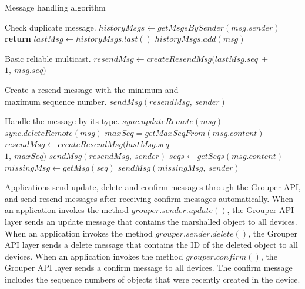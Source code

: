 \documentclass{sig-alternate-05-2015}
\begin{document}
\begin{algorithm}[t]
	\caption{Message handling algorithm}\label{alg:euclid}
	\begin{algorithmic}[1]		
		\LeftComment Check duplicate message.
		\State  $historyMsgs \gets getMsgsBySender(msg.sender)$
		\State \textbf{return}
		\EndIf
		\State $lastMsg \gets historyMsgs.last()$
		\State $historyMsgs.add(msg)$
		
		\LeftComment Basic reliable multicast.
		\State $resendMsg \gets createResendMsg(lastMsg.seq\ +\ $ \\\hspace{2.7cm} $1,\ msg.seq)$
		
		\Comment Create a resend message with the minimum and \\\hspace{1.7cm} maximum sequence number.
		\State $sendMsg(resendMsg,\ sender)$
		\EndIf
		
		\LeftComment Handle the message by its type.
		\State $sync.updateRemote(msg)$
		\State $sync.deleteRemote(msg)$
		\State $maxSeq = getMaxSeqFrom(msg.content)$
		\State $resendMsg \gets createResendMsg(lastMsg.seq\ +\ $ \\\hspace{2.7cm}  $1,\ maxSeq)$
		\State $sendMsg(resendMsg,\ sender)$
		\EndIf
		\State $seqs \gets getSeqs(msg.content)$
		\State $missingMsg \gets getMsg(seq)$
		\State $sendMsg(missingMsg,\ sender)$
		\EndFor
		\EndIf
		\EndProcedure
	\end{algorithmic}
\end{algorithm}

Applications send update, delete and confirm messages through the Grouper API, and send resend messages after receiving confirm messages automatically.
When an application invokes the method $grouper.sender.update()$, the Grouper API layer sends an update message that contains the marshalled object to all devices.
When an application invokes the method $grouper.sender.delete()$, the Grouper API layer sends a delete message that contains the ID of the deleted object to all devices. 
When an application invokes the method $grouper.confirm()$, the Grouper API layer sends a confirm message to all devices. 
The confirm message includes the sequence numbers of objects that were recently created in the device.
\end{document}
